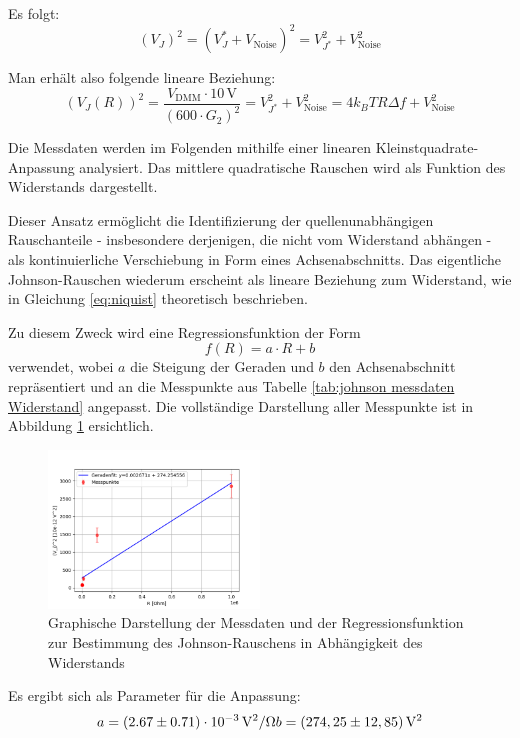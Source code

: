 \documentclass{article}
\begin{document}
Es folgt: 
\begin{equation}
(V_J)^2 = (V_J^* + V_{\text{Noise}})^2 = V_{J^*}^2 + V_{\text{Noise}}^2 
\end{equation}

Man erhält also folgende lineare Beziehung:
\begin{equation}
        (V_J(R))^2 = \frac{V_{\mathrm{DMM}} \cdot 10\,\mathrm{V}}{(600 \cdot G_2)^2} = V_{J^*}^2 + V_{\text{Noise}}^2 = 4k_B T R \Delta f + V_{\text{Noise}}^2
\end{equation}

Die Messdaten werden im Folgenden mithilfe einer linearen Kleinstquadrate-Anpassung analysiert. Das mittlere quadratische Rauschen wird als Funktion des Widerstands dargestellt.

Dieser Ansatz ermöglicht die Identifizierung der quellenunabhängigen Rauschanteile - insbesondere derjenigen, die nicht vom Widerstand abhängen - als kontinuierliche Verschiebung in Form eines Achsenabschnitts. Das eigentliche Johnson-Rauschen wiederum erscheint als lineare Beziehung zum Widerstand, wie in Gleichung \ref{eq:niquist} theoretisch beschrieben.

Zu diesem Zweck wird eine Regressionsfunktion der Form
\begin{equation}
f(R) = a \cdot R + b
\end{equation}
verwendet, wobei $a$ die Steigung der Geraden und $b$ den Achsenabschnitt repräsentiert und an die Messpunkte aus Tabelle \ref{tab:johnson messdaten Widerstand} angepasst. Die vollständige Darstellung aller Messpunkte ist in Abbildung \ref{fig:fit1} ersichtlich.
\begin{figure}[htbp]
    \centering
    \includegraphics[width=0.5\textwidth]{figs/johnson_resistance.png}
    \caption{Graphische Darstellung der Messdaten und der Regressionsfunktion zur Bestimmung des Johnson-Rauschens in Abhängigkeit des Widerstands}
    \label{fig:fit1}
\end{figure}
\FloatBarrier

Es ergibt sich als Parameter für die Anpassung:
\begin{equation}
a = (2.67 \pm 0.71) \cdot 10^{-3} \, \mathrm{V}^2/\Omega\\
b = (274,25 \pm 12,85) \, \mathrm{V}^2
\end{equation}
\end{document}
